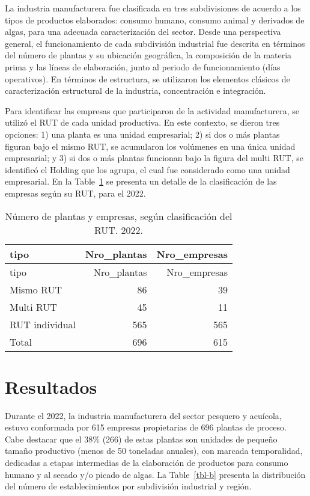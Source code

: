 \documentclass[
  super,
  preprint,
  3p]{elsarticle}
\begin{document}
La industria manufacturera fue clasificada en tres subdivisiones de
acuerdo a los tipos de productos elaborados: consumo humano, consumo
animal y derivados de algas, para una adecuada caracterización del
sector. Desde una perspectiva general, el funcionamiento de cada
subdivisión industrial fue descrita en términos del número de plantas y
su ubicación geográfica, la composición de la materia prima y las líneas
de elaboración, junto al periodo de funcionamiento (días operativos). En
términos de estructura, se utilizaron los elementos clásicos de
caracterización estructural de la industria, concentración e
integración.

Para identificar las empresas que participaron de la actividad
manufacturera, se utilizó el RUT de cada unidad productiva. En este
contexto, se dieron tres opciones: 1) una planta es una unidad
empresarial; 2) si dos o más plantas figuran bajo el mismo RUT, se
acumularon los volúmenes en una única unidad empresarial; y 3) si dos o
más plantas funcionan bajo la figura del multi RUT, se identificó el
Holding que los agrupa, el cual fue considerado como una unidad
empresarial. En la Table~\ref{tbl-a} se presenta un detalle de la
clasificación de las empresas según su RUT, para el 2022.

\hypertarget{tbl-a}{}
\begin{longtable}[]{@{}lrr@{}}
\caption{\label{tbl-a}Número de plantas y empresas, según clasificación
del RUT. 2022.}\tabularnewline
\toprule\noalign{}
tipo & Nro\_plantas & Nro\_empresas \\
\midrule\noalign{}
\endfirsthead
\toprule\noalign{}
tipo & Nro\_plantas & Nro\_empresas \\
\midrule\noalign{}
\endhead
\bottomrule\noalign{}
\endlastfoot
Mismo RUT & 86 & 39 \\
Multi RUT & 45 & 11 \\
RUT individual & 565 & 565 \\
Total & 696 & 615 \\
\end{longtable}

\hypertarget{resultados}{%
\section{Resultados}\label{resultados}}

Durante el 2022, la industria manufacturera del sector pesquero y
acuícola, estuvo conformada por 615 empresas propietarias de 696 plantas
de proceso. Cabe destacar que el 38\% (266) de estas plantas son
unidades de pequeño tamaño productivo (menos de 50 toneladas anuales),
con marcada temporalidad, dedicadas a etapas intermedias de la
elaboración de productos para consumo humano y al secado y/o picado de
algas. La Table~\ref{tbl-b} presenta la distribución del número de
establecimientos por subdivisión industrial y región.
\end{document}
